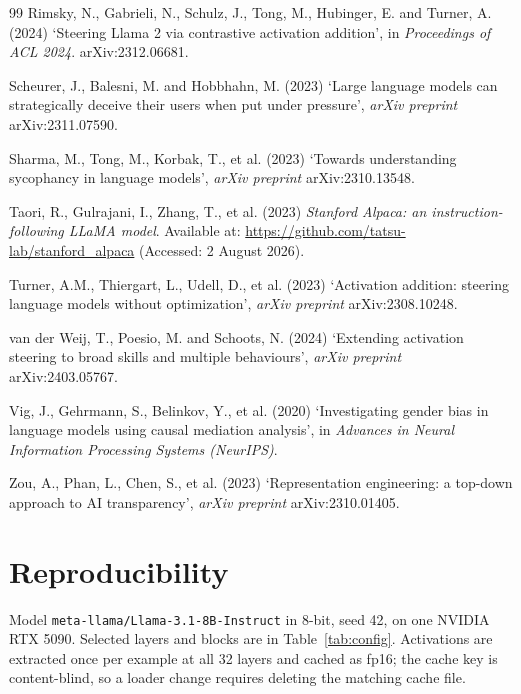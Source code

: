 \documentclass[conference]{IEEEtran}
\begin{document}
\begin{thebibliography}{99}
Rimsky, N., Gabrieli, N., Schulz, J., Tong, M., Hubinger, E. and Turner, A.
(2024) `Steering Llama 2 via contrastive activation addition', in
\textit{Proceedings of ACL 2024}. arXiv:2312.06681.

Scheurer, J., Balesni, M. and Hobbhahn, M. (2023) `Large language models can
strategically deceive their users when put under pressure',
\textit{arXiv preprint} arXiv:2311.07590.

Sharma, M., Tong, M., Korbak, T., et al. (2023) `Towards understanding sycophancy
in language models', \textit{arXiv preprint} arXiv:2310.13548.

Taori, R., Gulrajani, I., Zhang, T., et al. (2023) \textit{Stanford Alpaca: an
instruction-following LLaMA model}. Available at:
\url{https://github.com/tatsu-lab/stanford_alpaca} (Accessed: 2 August 2026).

Turner, A.M., Thiergart, L., Udell, D., et al. (2023) `Activation addition:
steering language models without optimization', \textit{arXiv preprint}
arXiv:2308.10248.

van der Weij, T., Poesio, M. and Schoots, N. (2024) `Extending activation
steering to broad skills and multiple behaviours', \textit{arXiv preprint}
arXiv:2403.05767.

Vig, J., Gehrmann, S., Belinkov, Y., et al. (2020) `Investigating gender bias in
language models using causal mediation analysis', in \textit{Advances in Neural
Information Processing Systems (NeurIPS)}.

Zou, A., Phan, L., Chen, S., et al. (2023) `Representation engineering: a
top-down approach to AI transparency', \textit{arXiv preprint} arXiv:2310.01405.

\end{thebibliography}

\appendices



\section{Reproducibility}
\label{app:repro}
Model \texttt{meta-llama/Llama-3.1-8B-Instruct} in 8-bit, seed 42, on one NVIDIA RTX 5090. Selected
layers and blocks are in Table~\ref{tab:config}. Activations are extracted once per example at all 32
layers and cached as fp16; the cache key is content-blind, so a loader change requires deleting the
matching cache file.
\end{document}
